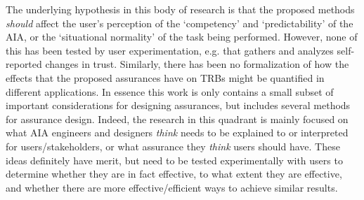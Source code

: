 The underlying hypothesis in this body of research is that the proposed methods \emph{should} affect the user's perception of the `competency' and `predictability' of the AIA, or the `situational normality' of the task being performed. However, none of this has been tested by user experimentation, e.g. that gathers and analyzes self-reported changes in trust. Similarly, there has been no formalization of how the effects that the proposed assurances have on TRBs might be quantified in different applications. In essence this work is only contains a small subset of important considerations for designing assurances, but includes several methods for assurance design. 
Indeed, the research in this quadrant is mainly focused on what AIA engineers and designers \emph{think} needs to be explained to or interpreted for users/stakeholders, or what assurance they \emph{think} users should have. 
These ideas definitely have merit, but need to be tested experimentally with users to determine whether they are in fact effective, to what extent they are effective, and whether there are more effective/efficient ways to achieve similar results. 

